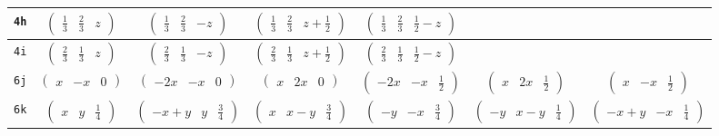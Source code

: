 \documentclass[fleqn,9pt,landscape]{jsarticle}
\begin{document}
\begin{center}
\begin{longtable}{ccccccc}
{\tt 4h} & $ \begin{pmatrix} \frac{1}{3} & \frac{2}{3} & z \end{pmatrix} $ & $ \begin{pmatrix} \frac{1}{3} & \frac{2}{3} & - z \end{pmatrix} $ & $ \begin{pmatrix} \frac{1}{3} & \frac{2}{3} & z + \frac{1}{2} \end{pmatrix} $ & $ \begin{pmatrix} \frac{1}{3} & \frac{2}{3} & \frac{1}{2} - z \end{pmatrix} $ & $  $ & $  $ \\ \hline
{\tt 4i} & $ \begin{pmatrix} \frac{2}{3} & \frac{1}{3} & z \end{pmatrix} $ & $ \begin{pmatrix} \frac{2}{3} & \frac{1}{3} & - z \end{pmatrix} $ & $ \begin{pmatrix} \frac{2}{3} & \frac{1}{3} & z + \frac{1}{2} \end{pmatrix} $ & $ \begin{pmatrix} \frac{2}{3} & \frac{1}{3} & \frac{1}{2} - z \end{pmatrix} $ & $  $ & $  $ \\ \hline
{\tt 6j} & $ \begin{pmatrix} x & - x & 0 \end{pmatrix} $ & $ \begin{pmatrix} - 2 x & - x & 0 \end{pmatrix} $ & $ \begin{pmatrix} x & 2 x & 0 \end{pmatrix} $ & $ \begin{pmatrix} - 2 x & - x & \frac{1}{2} \end{pmatrix} $ & $ \begin{pmatrix} x & 2 x & \frac{1}{2} \end{pmatrix} $ & $ \begin{pmatrix} x & - x & \frac{1}{2} \end{pmatrix} $ \\ \hline
{\tt 6k} & $ \begin{pmatrix} x & y & \frac{1}{4} \end{pmatrix} $ & $ \begin{pmatrix} - x + y & y & \frac{3}{4} \end{pmatrix} $ & $ \begin{pmatrix} x & x - y & \frac{3}{4} \end{pmatrix} $ & $ \begin{pmatrix} - y & - x & \frac{3}{4} \end{pmatrix} $ & $ \begin{pmatrix} - y & x - y & \frac{1}{4} \end{pmatrix} $ & $ \begin{pmatrix} - x + y & - x & \frac{1}{4} \end{pmatrix} $ \\ \hline

\end{longtable}
\end{center}
\end{document}
